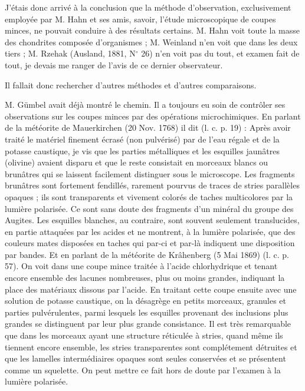\documentclass[a4paper, 12pt, oneside, french]{book}
\begin{document}
J'étais donc arrivé à la conclusion que la méthode d'observation, exclusivement employée par M. Hahn et ses amis, savoir, l'étude microscopique de coupes minces, ne pouvait conduire à des résultats certains. M. Hahn voit toute la masse des chondrites composée d'organismes ; M. Weinland n'en voit que dans les deux tiers ; M. Rzehak (Ausland, 1881, N$^{\circ}$ 26) n'en voit pas du tout, et examen fait de tout, je devais me ranger de l'avis de ce dernier observateur.

Il fallait donc rechercher d'autres méthodes et d'autres comparaisons.

M. Gümbel avait déjà montré le chemin. Il a toujours eu soin de contrôler ses observations sur les coupes minces par des opérations microchimiques. En parlant de la météorite de Mauerkirchen (20 Nov. 1768) il dit (l. c. p. 19) : \og Après avoir traité le matériel finement écrasé (non pulvérisé) par de l'eau régale et de la potasse caustique, je vis que les parties métalliques et les esquilles jaunâtres (olivine) avaient disparu et que le reste consistait en morceaux blancs ou brunâtres qui se laissent facilement distinguer sous le microscope. Les fragments brunâtres sont fortement fendillés, rarement pourvus de traces de stries parallèles opaques ; ils sont transparents et vivement colorés de taches multicolores par la lumière polarisée. Ce sont sans doute des fragments d'un minéral du groupe des Augites. Les esquilles blanches, au contraire, sont souvent seulement translucides, en partie attaquées par les acides et ne montrent, à la lumière polarisée, que des couleurs mates disposées en taches qui par-ci et par-là indiquent une disposition par bandes. \fg Et en parlant de la météorite de Krâhenberg (5 Mai 1869) (l. c. p. 57). On voit dans une coupe mince traitée à l'acide chlorhydrique et tenant encore ensemble des lacunes nombreuses, plus ou moins grandes, indiquant la place des matériaux dissous par l'acide. En traitant cette coupe ensuite avec une solution de potasse caustique, on la désagrège en petits morceaux, granules et parties pulvérulentes, parmi lesquels les esquilles provenant des inclusions plus grandes se distinguent par leur plus grande consistance. Il est très remarquable que dans les morceaux ayant une structure réticulée à stries, quand même ils tiennent encore ensemble, les stries transparentes sont complétement détruites et que les lamelles intermédiaires opaques sont seules conservées et se présentent comme un squelette. On peut mettre ce fait hors de doute par l'examen à la lumière polarisée. \fg
\end{document}
